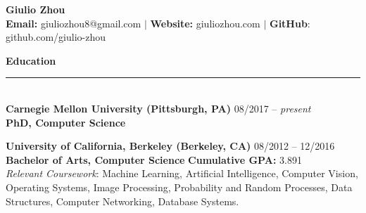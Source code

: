 \documentclass{article}
\begin{document}
\newcommand{\HRule}{\rule{\linewidth}{0.2mm}}


\begin{center}
\textbf{{\LARGE Giulio Zhou}} \\ 
\textbf{\fontsize{11}{13.2} Email:} giuliozhou8@gmail.com  $|$ \textbf{Website:} giuliozhou.com $|$ \textbf{GitHub}: github.com/giulio-zhou\\[2mm]
\end{center}


\normalsize
\noindent
\textbf{{\Large Education}}\\[-2mm]
\HRule\\
\textbf{Carnegie Mellon University (Pittsburgh, PA)}
\hfill 08/2017 -- \textit{present} \\
\indent
\textbf{PhD, Computer Science}
\vspace{1mm}

\noindent
\textbf{University of California, Berkeley (Berkeley, CA)}
\hfill 08/2012 -- 12/2016 \\
\indent
\textbf{Bachelor of Arts, Computer Science}
\hfill{\textbf{Cumulative GPA: }3.891}\\
\textit{Relevant Coursework}: Machine Learning, Artificial Intelligence, Computer Vision, Operating Systems, Image Processing, Probability and Random Processes, Data Structures, Computer Networking, Database Systems.
\\
\end{document}
